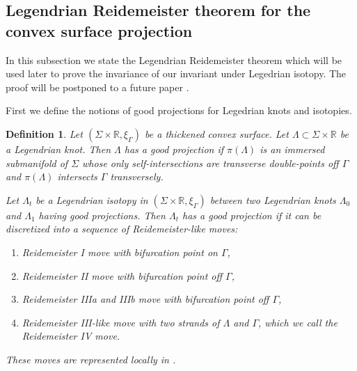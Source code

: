 \documentclass[11pt]{amsart}
\theoremstyle{mystyle}
\newtheorem{definition}{Definition}[section]
\newcommand{\R}{\mathbb{R}}
\newcommand{\<}{\langle}
\renewcommand{\>}{\rangle}
\begin{document}
\subsection{Legendrian Reidemeister theorem for the convex surface projection}

In this subsection we state the Legendrian Reidemeister theorem which will be used later to prove the invariance of our invariant under Legedrian isotopy. The proof will be postponed to a future paper \cite{Rong2026}.

First we define the notions of good projections for Legedrian knots and isotopies.

\begin{definition}\label{dfn: reidemeister}
	Let $(\Sigma \times \R, \xi_\Gamma)$ be a thickened convex surface. Let $\Lambda \subset \Sigma \times \R$ be a Legendrian knot. Then $\Lambda$ has a \textit{good} projection if $\pi(\Lambda)$ is an immersed submanifold of $\Sigma$ whose only self-intersections are transverse double-points off $\Gamma$ and $\pi(\Lambda)$ intersects $\Gamma$ transversely.

    Let $\Lambda_t$ be a Legendrian isotopy in $(\Sigma \times \R, \xi_\Gamma)$ between two Legendrian knots $\Lambda_0$ and $\Lambda_1$ having good projections. Then $\Lambda_t$ has a \textit{good} projection if it can be discretized into a sequence of Reidemeister-like moves:
	\begin{enumerate}[label=(\alph*)]
	    \item  Reidemeister I move with bifurcation point on $\Gamma$,
        \item  Reidemeister II move with bifurcation point off $\Gamma$,
        \item  Reidemeister IIIa and IIIb move with bifurcation point off $\Gamma$,
        \item  Reidemeister III-like move with two strands of $\Lambda$ and $\Gamma$, which we call the Reidemeister IV move.
	\end{enumerate}
	These moves are represented locally in .
\end{definition}
\end{document}

